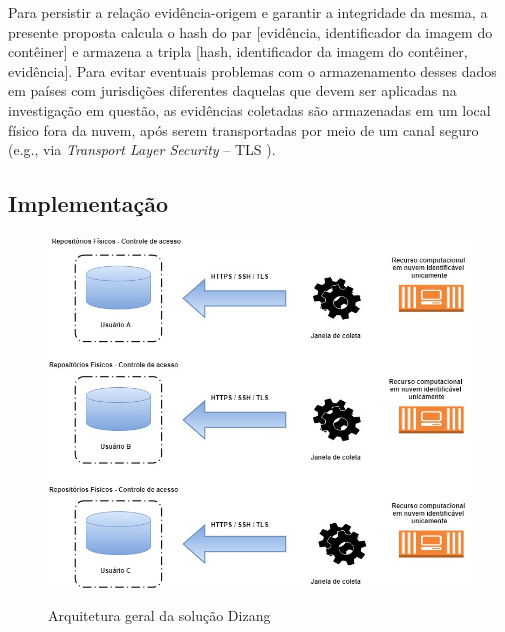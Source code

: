 \documentclass[conference]{IEEEtran}
\newcommand{\marcosT}[1]{{\color{red}{TODO: #1}}}
\begin{document}
Para persistir a relação evidência-origem e garantir a integridade da mesma, a presente proposta calcula o hash do par [evidência, identificador da imagem do contêiner] e armazena a tripla [hash, identificador da imagem do contêiner, evidência].
%
Para evitar eventuais problemas com o armazenamento desses dados em países com jurisdições diferentes daquelas que devem ser aplicadas na investigação em questão, as evidências coletadas são armazenadas em um local físico fora da nuvem, após serem transportadas por meio de um canal seguro (e.g., via \textit{Transport Layer Security} -- TLS \cite{DierksT2008}).
%

\subsection{Implementação}
\label{sec:proposal-impl}


\begin{figure}[htb!]
\footnotesize
\caption{Arquitetura geral da solução Dizang}
\includegraphics[scale=0.31]{solucao.jpg}
\centering
\label{fig:Solucao}
\end{figure}
\end{document}
